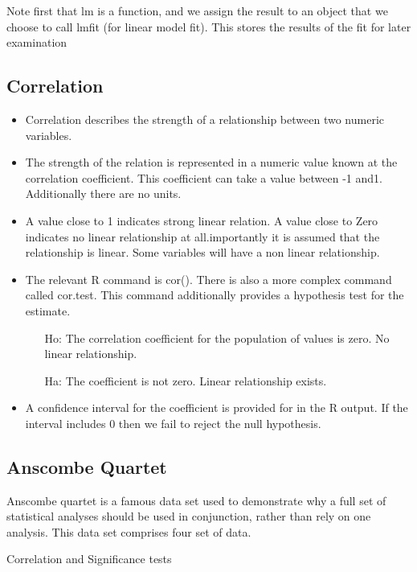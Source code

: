  Note first that lm is a function, and we assign the result to an object that we choose to call lmfit (for linear model fit). This stores the results of the fit for later examination


\subsection{Correlation }

\begin{itemize}
\item Correlation describes the strength of a relationship between two numeric variables.
\item The strength of the relation is represented in a numeric value known at the correlation coefficient. This coefficient can take a value between -1 and1. Additionally there are no units.

\item A value close to 1 indicates strong linear relation. A value close to Zero indicates no linear relationship at all.importantly it is assumed that the relationship is linear. Some variables will have a non linear relationship.

\item The relevant R command is cor(). There is also a more complex command called cor.test. This command additionally provides a hypothesis test for the estimate.
\begin{itemize}
\item[Ho:] The correlation coefficient for the population of values is zero. No linear relationship.
\item[Ha:] The coefficient is not zero. Linear relationship exists.
\end{itemize}
\item A confidence interval for the coefficient is provided for in the R output. If the interval includes 0 then we fail to reject the null hypothesis.
\end{itemize}
\subsection{Anscombe Quartet}
Anscombe quartet is a famous data set used to demonstrate why a full set of statistical analyses should be used in conjunction, rather than rely on one analysis. This data set comprises four set of data.

Correlation and Significance tests

